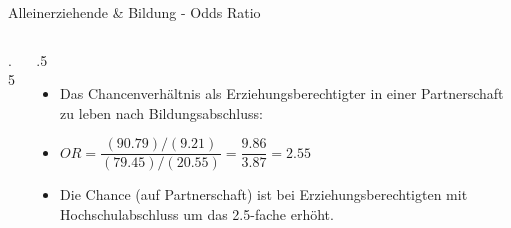 \documentclass[18pt,handout, aspectratio=169]{beamer}
\begin{document}
\begin{frame}{Alleinerziehende \& Bildung - Odds Ratio}
\begin{columns}

\begin{column}{.5\linewidth}
\end{column}

\begin{column}{.5\linewidth}
\small
\begin{itemize}
  \item Das Chancenverhältnis als Erziehungsberechtigter in einer Partnerschaft zu leben nach Bildungsabschluss: 
  \item[] $OR = \dfrac{(90.79 ) / (9.21)}{(79.45 ) / (20.55)} = \dfrac{9.86}{3.87} = 2.55 $
  \item Die Chance (auf Partnerschaft) ist bei Erziehungsberechtigten mit Hochschulabschluss um das 2.5-fache erhöht. 
\end{itemize}
\end{column}

\end{columns}
\end{frame}
\end{document}

